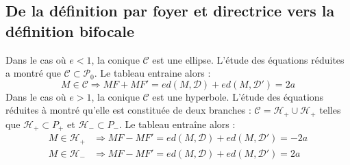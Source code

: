 \subsection{De la définition par foyer et directrice vers la définition bifocale}
Dans le cas où $e<1$, la conique $\mathcal C$ est une ellipse. L'étude des équations réduites a montré que $\mathcal C \subset \mathcal P_0$. Le tableau entraine alors :
\begin{displaymath}
 M\in \mathcal C \Rightarrow MF + MF' = ed(M,\mathcal D) + ed(M,\mathcal D') = 2a
\end{displaymath}
Dans le cas où $e>1$, la conique  $\mathcal C$ est une hyperbole. L'étude des équations réduites à montré qu'elle est constituée de deux branches : $\mathcal C = \mathcal H_+ \cup \mathcal H_+$ telles que $\mathcal H_+\subset P_+$ et $\mathcal H_-\subset P_-$. Le tableau entraîne alors :
\begin{align*}
 M\in \mathcal H_+ &\Rightarrow MF - MF' = ed(M,\mathcal D) + ed(M,\mathcal D') = -2a \\
 M\in \mathcal H_- &\Rightarrow MF - MF' = ed(M,\mathcal D) + ed(M,\mathcal D') = 2a \\
\end{align*}


